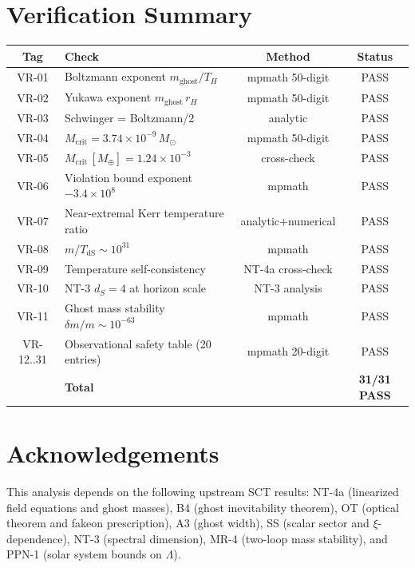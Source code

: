 \documentclass[11pt,a4paper]{article}
\newcommand{\Msun}{M_{\odot}}
\newcommand{\Mcrit}{M_{\mathrm{crit}}}
\newcommand{\mghost}{m_{\mathrm{ghost}}}
\newcommand{\Thr}{T_{\!\scriptscriptstyle H}}
\theoremstyle{plain}
\theoremstyle{definition}
\begin{document}
\section{Verification Summary}\label{sec:verification}

\begin{center}
\small
\begin{tabular}{@{}clcc@{}}
\toprule
\textbf{Tag} & \textbf{Check} & \textbf{Method}
  & \textbf{Status} \\
\midrule
VR-01 & Boltzmann exponent $\mghost/\Thr$ & mpmath 50-digit & PASS \\
VR-02 & Yukawa exponent $\mghost\,r_H$ & mpmath 50-digit & PASS \\
VR-03 & Schwinger = Boltzmann/2 & analytic & PASS \\
VR-04 & $\Mcrit = 3.74\times 10^{-9}\,\Msun$ & mpmath 50-digit & PASS \\
VR-05 & $\Mcrit\,[M_\oplus] = 1.24\times 10^{-3}$ & cross-check & PASS \\
VR-06 & Violation bound exponent $-3.4\times 10^{8}$ & mpmath & PASS \\
VR-07 & Near-extremal Kerr temperature ratio & analytic+numerical & PASS \\
VR-08 & $m/T_{\mathrm{dS}} \sim 10^{31}$ & mpmath & PASS \\
VR-09 & Temperature self-consistency & NT-4a cross-check & PASS \\
VR-10 & NT-3 $d_S = 4$ at horizon scale & NT-3 analysis & PASS \\
VR-11 & Ghost mass stability $\delta m/m \sim 10^{-63}$ & mpmath & PASS \\
VR-12..31 & Observational safety table (20 entries) & mpmath 20-digit & PASS \\
\midrule
& \textbf{Total} & & \textbf{31/31 PASS} \\
\bottomrule
\end{tabular}
\end{center}


\section*{Acknowledgements}

This analysis depends on the following upstream SCT results: NT-4a
(linearized field equations and ghost masses), B4 (ghost inevitability
theorem), OT (optical theorem and fakeon prescription), A3 (ghost
width), SS (scalar sector and $\xi$-dependence), NT-3 (spectral
dimension), MR-4 (two-loop mass stability), and PPN-1 (solar system
bounds on $\Lambda$).
\end{document}
